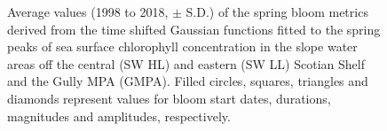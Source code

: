 \documentclass[12pt]{article}\usepackage[]{graphicx}\usepackage[]{color}
\begin{document}
\begin{figure}[htb]

{\centering {} 

}

\caption{Average values (1998 to 2018, \(\pm\) S.D.) of the spring bloom metrics derived from the time shifted Gaussian functions fitted to the spring peaks of sea surface chlorophyll concentration in the slope water areas off the central (SW HL) and eastern (SW LL) Scotian Shelf and the Gully MPA (GMPA). Filled circles, squares, triangles and diamonds represent values for bloom start dates, durations, magnitudes and amplitudes, respectively.}\label{fig:figure27}
\end{figure}
\clearpage
\end{document}
